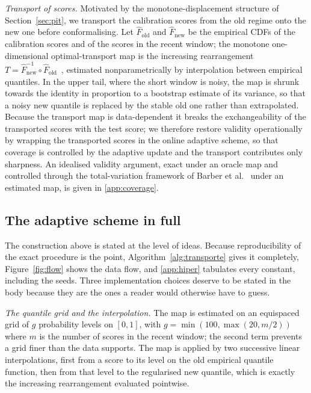 \documentclass[preprint,3p,times]{elsarticle}
\begin{document}
\emph{Transport of scores.} Motivated by the monotone-displacement structure of Section~\ref{sec:pit}, we transport the calibration scores from the old regime onto the new one before conformalising. Let $\hat F_{\mathrm{old}}$ and $\hat F_{\mathrm{new}}$ be the empirical CDFs of the calibration scores and of the scores in the recent window; the monotone one-dimensional optimal-transport map is the increasing rearrangement $T=\hat F_{\mathrm{new}}^{-1}\circ\hat F_{\mathrm{old}}$~\cite{peyre2019}, estimated nonparametrically by interpolation between empirical quantiles. In the upper tail, where the short window is noisy, the map is shrunk towards the identity in proportion to a bootstrap estimate of its variance, so that a noisy new quantile is replaced by the stable old one rather than extrapolated. Because the transport map is data-dependent it breaks the exchangeability of the transported scores with the test score; we therefore restore validity operationally by wrapping the transported scores in the online adaptive scheme, so that coverage is controlled by the adaptive update and the transport contributes only sharpness. An idealised validity argument, exact under an oracle map and controlled through the total-variation framework of Barber et al.~\cite{barber2023} under an estimated map, is given in \ref{app:coverage}.

\subsection{The adaptive scheme in full}
\label{sec:algoritmo}

The construction above is stated at the level of ideas. Because reproducibility of the exact procedure is the point, Algorithm~\ref{alg:transporte} gives it completely, Figure~\ref{fig:flow} shows the data flow, and \ref{app:hiper} tabulates every constant, including the seeds. Three implementation choices deserve to be stated in the body because they are the ones a reader would otherwise have to guess.

\emph{The quantile grid and the interpolation.} The map is estimated on an equispaced grid of $g$ probability levels on $[0,1]$, with $g=\min(100,\max(20,m/2))$ where $m$ is the number of scores in the recent window; the second term prevents a grid finer than the data supports. The map is applied by two successive linear interpolations, first from a score to its level on the old empirical quantile function, then from that level to the regularised new quantile, which is exactly the increasing rearrangement evaluated pointwise.
\end{document}
